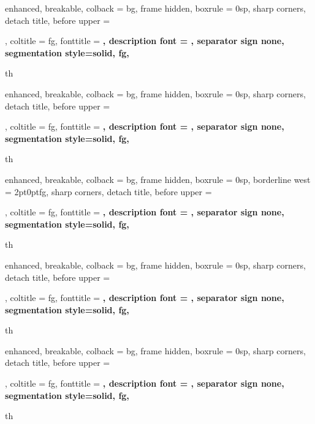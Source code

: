 {%
	enhanced,
	breakable,
	colback = bg,
	frame hidden,
	boxrule = 0sp,
	sharp corners,
	detach title,
	before upper = \tcbtitle\par\smallskip,
	coltitle = fg,
	fonttitle = \bfseries\sffamily,
	description font = \mdseries,
	separator sign none,
	segmentation style={solid, fg},
}
{th}
{%
	enhanced,
	breakable,
	colback = bg,
	frame hidden,
	boxrule = 0sp,
	sharp corners,
	detach title,
	before upper = \tcbtitle\par\smallskip,
	coltitle = fg,
	fonttitle = \bfseries\sffamily,
	description font = \mdseries,
	separator sign none,
	segmentation style={solid, fg},
}
{th}


{%
	enhanced,
	breakable,
	colback = bg,
	frame hidden,
	boxrule = 0sp,
	borderline west = {2pt}{0pt}{fg},
	sharp corners,
	detach title,
	before upper = \tcbtitle\par\smallskip,
	coltitle = fg,
	fonttitle = \bfseries\sffamily,
	description font = \mdseries,
	separator sign none,
	segmentation style={solid, fg},
}
{th}

{%
	enhanced,
	breakable,
	colback = bg,
	frame hidden,
	boxrule = 0sp,
	sharp corners,
	detach title,
	before upper = \tcbtitle\par\smallskip,
	coltitle = fg,
	fonttitle = \bfseries\sffamily,
	description font = \mdseries,
	separator sign none,
	segmentation style={solid, fg},
}
{th}
{%
	enhanced,
	breakable,
	colback = bg,
	frame hidden,
	boxrule = 0sp,
	sharp corners,
	detach title,
	before upper = \tcbtitle\par\smallskip,
	coltitle = fg,
	fonttitle = \bfseries\sffamily,
	description font = \mdseries,
	separator sign none,
	segmentation style={solid, fg},
}
{th}


